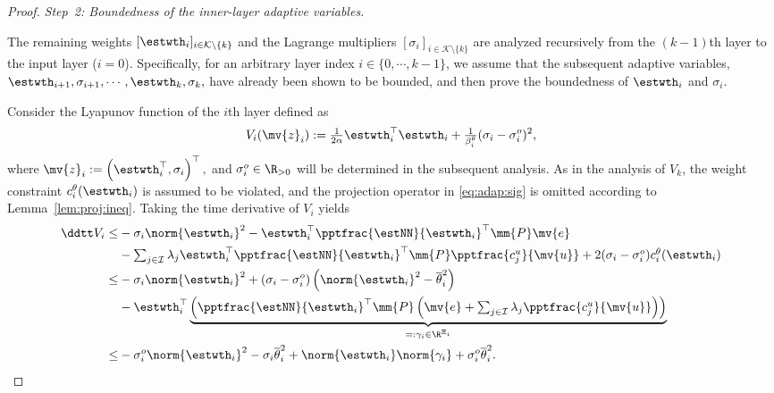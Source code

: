 \documentclass[letterpaper, journal, twoside]{IEEEtran}
\begin{document}
\begin{proof}
\hfill

\textit{Step~2: Boundedness of the inner-layer adaptive variables.}

The remaining weights $[\estwth_i]_{i\in\mathcal{K}\setminus\{k\}}$ and the Lagrange multipliers $[\sigma_i]_{i\in\mathcal{K}\setminus\{k\}}$ are analyzed recursively from the $(k-1)$th layer to the input layer ($i=0$). 
Specifically, for an arbitrary layer index $i\in\{0,\cdots,k-1\}$, we assume that the subsequent adaptive variables, $\estwth_{i+1},\sigma_{i+1},\cdots,\estwth_k,\sigma_k,$ have already been shown to be bounded, and then prove the boundedness of $\estwth_i$ and $\sigma_i$.

Consider the Lyapunov function of the $i$th layer defined as
\begin{equation} \label{eq:Vi:def}
  V_{i}(\mv{z}_i)
  :=
  \tfrac{1}{2\alpha}\estwth_i^\top\estwth_i
  +
  \tfrac{1}{\beta_i^\theta}(\sigma_i-\sigma_i^o)^2
  ,
\end{equation}
where 
$
  \mv{z}_i:=
  \left(
    \estwth_i^\top,
    \sigma_i
  \right)^\top
  ,
$
and $\sigma_i^o\in\R_{>0}$ will be determined in the subsequent analysis.
As in the analysis of $V_k$, the weight constraint $c_i^{\theta}(\estwth_i)$ is assumed to be violated, and the projection operator in \eqref{eq:adap:sig} is omitted according to Lemma~\ref{lem:proj:ineq}.
Taking the time derivative of $V_i$ yields
\begin{align} \label{eq:Vi:dot:1} 
  \ddtt V_i
  \le&
    -\sigma_i \norm{\estwth_i}^2
    -
    \estwth_i^\top
    {\pptfrac{\estNN}{\estwth_i}}^\top
    \mm{P}
    \mv{e}
  \\ \nonumber
  &
    -
    \textstyle\sum_{j\in\mathcal{I}}
    \lambda_j 
    \estwth_i^\top
    {\pptfrac{\estNN}{\estwth_i}}^\top
    \mm{P}
    \pptfrac{c^{u}_{j}}{\mv{u}}
    +
    2(\sigma_i-\sigma_i^o) c_i^{\theta}(\estwth_i)
  \\ \nonumber
  \le&
    -\sigma_i \norm{\estwth_i}^2
    +
    (\sigma_i-\sigma_i^o) 
    \left(
      \norm{\estwth_i}^2
      -
      \overline{\theta}_i^2
    \right)
  \\ \nonumber
  &
    -
    \estwth_i^\top
    \underbrace{
    \left(
      {\pptfrac{\estNN}{\estwth_i}}^\top
      \mm{P}
      \left(
        \mv{e}
        +
        \textstyle\sum_{j\in\mathcal{I}}
        \lambda_j 
        \pptfrac{c^{u}_{j}}{\mv{u}}
      \right)
    \right)
    }_{=: \gamma_i\in\R^{\Xi_i}}
  \\ \nonumber
  \le&
    -\sigma_i^o \norm{\estwth_i}^2
    -\sigma_i \overline{\theta}_i^2
    +
    \norm{\estwth_i}
    \norm{\gamma_i}
    +
    \sigma_i^o \overline{\theta}_i^2
  .
\end{align}


\end{proof}
\end{document}
